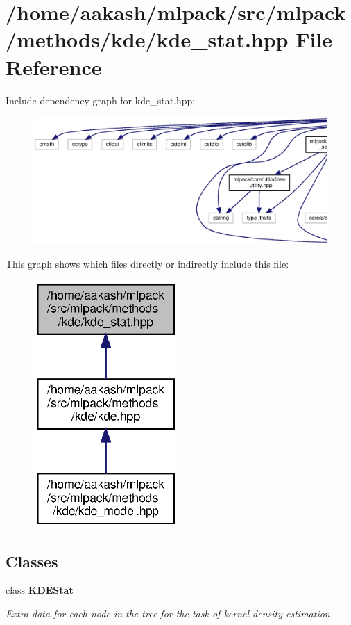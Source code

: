 \section{/home/aakash/mlpack/src/mlpack/methods/kde/kde\+\_\+stat.hpp File Reference}
\label{kde__stat_8hpp}
Include dependency graph for kde\+\_\+stat.\+hpp\+:
\nopagebreak
\begin{figure}[H]
\begin{center}
\leavevmode
\includegraphics[width=350pt]{kde__stat_8hpp__incl}
\end{center}
\end{figure}
This graph shows which files directly or indirectly include this file\+:
\nopagebreak
\begin{figure}[H]
\begin{center}
\leavevmode
\includegraphics[width=157pt]{kde__stat_8hpp__dep__incl}
\end{center}
\end{figure}
\subsection*{Classes}
\begin{DoxyCompactItemize}
\item 
class \textbf{ K\+D\+E\+Stat}
\begin{DoxyCompactList}\small\item\em Extra data for each node in the tree for the task of kernel density estimation. \end{DoxyCompactList}\end{DoxyCompactItemize}

